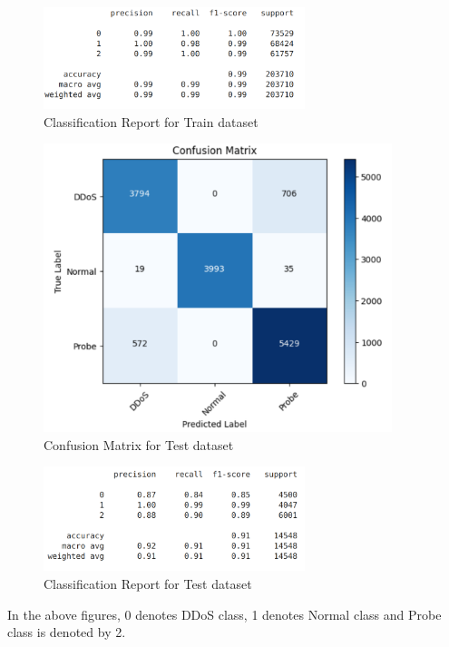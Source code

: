 \begin{figure}[tbh] %
	\begin{center}
		\includegraphics[width=3in]{images/cReportTrain.png} 
		\caption{Classification Report for Train dataset} %
		\label{Classification Report for Train dataset} 
	\end{center}
\end{figure}
\begin{figure}[tbh] %
	\begin{center}
		\includegraphics[width=4in]{images/confMatTest.png} 
		\caption{Confusion Matrix for Test dataset} %
		\label{Confusion Matrix for Test dataset} 
	\end{center}
\end{figure}
\begin{figure}[tbh] %
	\begin{center}
		\includegraphics[width=3in]{images/cReportTest.png} 
		\caption{Classification Report for Test dataset} %
		\label{Classification Report for Test dataset} 
	\end{center}
\end{figure}
\newpage
In the above figures, 0 denotes DDoS class, 1 denotes Normal class and Probe class is denoted by 2.
